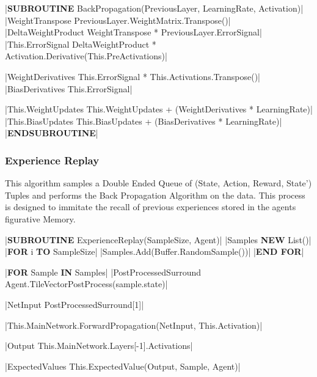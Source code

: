 \begin{flushleft}
                \vspace{0.2cm}
                \begin{pseudocode}
|\textbf{SUBROUTINE} BackPropagation(PreviousLayer, LearningRate, Activation)|
    |WeightTranspose \leftarrow PreviousLayer.WeightMatrix.Transpose()|
    |DeltaWeightProduct \leftarrow WeightTranspose * PreviousLayer.ErrorSignal|
    |This.ErrorSignal \leftarrow DeltaWeightProduct * Activation.Derivative(This.PreActivations)|

    |WeightDerivatives \leftarrow This.ErrorSignal * This.Activations.Transpose()|
    |BiasDerivatives \leftarrow This.ErrorSignal|

    |This.WeightUpdates \leftarrow This.WeightUpdates + (WeightDerivatives * LearningRate)|
    |This.BiasUpdates \leftarrow This.BiasUpdates + (BiasDerivatives * LearningRate)|
|\textbf{ENDSUBROUTINE}|
                \end{pseudocode}

                \vspace{0.5cm}
            \subsubsection{Experience Replay}
                This algorithm samples a Double Ended Queue of (State, Action, Reward, State') Tuples and performs the Back Propagation Algorithm
                on the data. This process is designed to immitate the recall of previous experiences stored in the agents figurative Memory.

                \vspace{0.2cm}
                \begin{pseudocode}
|\textbf{SUBROUTINE} ExperienceReplay(SampleSize, Agent)|
    |Samples \leftarrow \textbf{NEW} List()|
    |\textbf{FOR} i  \textbf{TO} SampleSize|
        |Samples.Add(Buffer.RandomSample())|
    |\textbf{END FOR}|

    |\textbf{FOR} Sample \textbf{IN} Samples|
        |PostProcessedSurround \leftarrow Agent.TileVectorPostProcess(sample.state)|

        |NetInput \leftarrow PostProcessedSurround[1]|

        |This.MainNetwork.ForwardPropagation(NetInput, This.Activation)|

        |Output \leftarrow This.MainNetwork.Layers[-1].Activations|

        |ExpectedValues \leftarrow This.ExpectedValue(Output, Sample, Agent)|


\end{pseudocode}
\end{flushleft}
